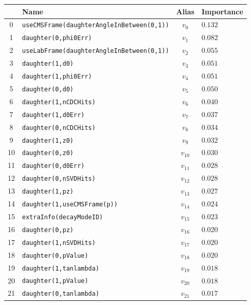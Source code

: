 \begin{longtable}{c|l|c|l}
& Name & Alias & Importance \\
\toprule 
0 &\texttt{\footnotesize useCMSFrame(daughterAngleInBetween(0,1))} & $v_{0}$ & $0.132$ \\ 
1 &\texttt{\footnotesize daughter(0,phi0Err)} & $v_{1}$ & $0.082$ \\ 
2 &\texttt{\footnotesize useLabFrame(daughterAngleInBetween(0,1))} & $v_{2}$ & $0.055$ \\ 
3 &\texttt{\footnotesize daughter(1,d0)} & $v_{3}$ & $0.051$ \\ 
4 &\texttt{\footnotesize daughter(1,phi0Err)} & $v_{4}$ & $0.051$ \\ 
5 &\texttt{\footnotesize daughter(0,d0)} & $v_{5}$ & $0.050$ \\ 
6 &\texttt{\footnotesize daughter(1,nCDCHits)} & $v_{6}$ & $0.040$ \\ 
7 &\texttt{\footnotesize daughter(1,d0Err)} & $v_{7}$ & $0.037$ \\ 
8 &\texttt{\footnotesize daughter(0,nCDCHits)} & $v_{8}$ & $0.034$ \\ 
9 &\texttt{\footnotesize daughter(1,z0)} & $v_{9}$ & $0.032$ \\ 
10 &\texttt{\footnotesize daughter(0,z0)} & $v_{10}$ & $0.030$ \\ 
11 &\texttt{\footnotesize daughter(0,d0Err)} & $v_{11}$ & $0.028$ \\ 
12 &\texttt{\footnotesize daughter(0,nSVDHits)} & $v_{12}$ & $0.028$ \\ 
13 &\texttt{\footnotesize daughter(1,pz)} & $v_{13}$ & $0.027$ \\ 
14 &\texttt{\footnotesize daughter(1,useCMSFrame(p))} & $v_{14}$ & $0.024$ \\ 
15 &\texttt{\footnotesize extraInfo(decayModeID)} & $v_{15}$ & $0.023$ \\ 
16 &\texttt{\footnotesize daughter(0,pz)} & $v_{16}$ & $0.020$ \\ 
17 &\texttt{\footnotesize daughter(1,nSVDHits)} & $v_{17}$ & $0.020$ \\ 
18 &\texttt{\footnotesize daughter(0,pValue)} & $v_{18}$ & $0.020$ \\ 
19 &\texttt{\footnotesize daughter(1,tanlambda)} & $v_{19}$ & $0.018$ \\ 
20 &\texttt{\footnotesize daughter(1,pValue)} & $v_{20}$ & $0.018$ \\ 
21 &\texttt{\footnotesize daughter(0,tanlambda)} & $v_{21}$ & $0.017$ \\ 

\end{longtable}
